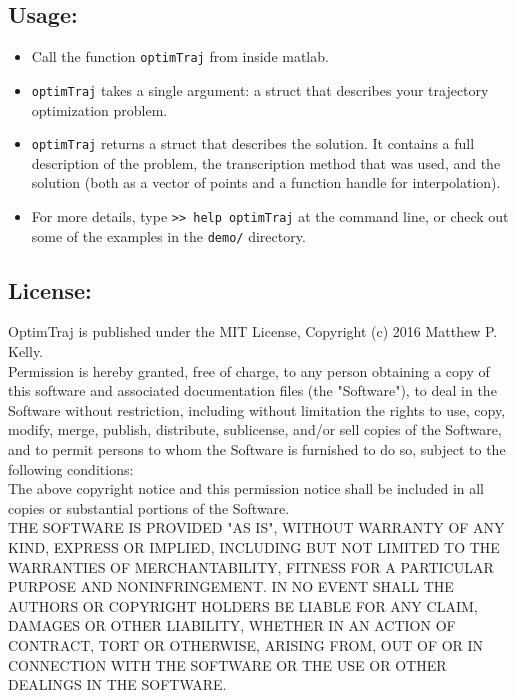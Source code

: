 \subsection{Usage: }
\begin{itemize} \setlength\itemsep{-0.1em}
\item Call the function \texttt{optimTraj} from inside matlab.
\item \texttt{optimTraj} takes a single argument: a struct that describes your trajectory optimization problem.
\item \texttt{optimTraj} returns a struct that describes the solution. It contains a full description of the problem, the transcription method that was used, and the solution (both as a vector of points and a function handle for interpolation).
\item For more details, type \texttt{>> help optimTraj} at the command line, or check out some of the examples in the \texttt{demo/} directory.
\end{itemize}

\subsection{License: }
OptimTraj is published under the MIT License, Copyright (c) 2016 Matthew P. Kelly.  \vspace{0.5em} \\

Permission is hereby granted, free of charge, to any person obtaining a copy
of this software and associated documentation files (the "Software"), to deal
in the Software without restriction, including without limitation the rights
to use, copy, modify, merge, publish, distribute, sublicense, and/or sell
copies of the Software, and to permit persons to whom the Software is
furnished to do so, subject to the following conditions:  \vspace{0.5em} \\

The above copyright notice and this permission notice shall be included in
all copies or substantial portions of the Software.  \vspace{0.5em} \\

THE SOFTWARE IS PROVIDED "AS IS", WITHOUT WARRANTY OF ANY KIND, EXPRESS OR
IMPLIED, INCLUDING BUT NOT LIMITED TO THE WARRANTIES OF MERCHANTABILITY,
FITNESS FOR A PARTICULAR PURPOSE AND NONINFRINGEMENT. IN NO EVENT SHALL THE
AUTHORS OR COPYRIGHT HOLDERS BE LIABLE FOR ANY CLAIM, DAMAGES OR OTHER
LIABILITY, WHETHER IN AN ACTION OF CONTRACT, TORT OR OTHERWISE, ARISING FROM,
OUT OF OR IN CONNECTION WITH THE SOFTWARE OR THE USE OR OTHER DEALINGS IN
THE SOFTWARE.
